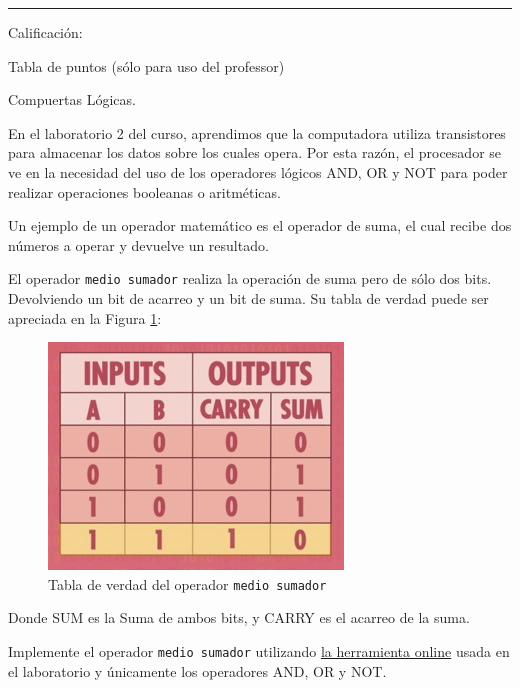 \documentclass[12pt]{exam}
\begin{document}
\newpage
\noindent
\rule[2ex]{\textwidth}{2pt}
\Large{Calificación}:
\normalsize
\begin{center}
Tabla de puntos (sólo para uso del professor)\\
\addpoints
\gradetable[v][questions]
\end{center}
\noindent
\newpage

\begin{questions}

\question[5] Compuertas Lógicas.

En el laboratorio 2 del curso, aprendimos que la computadora utiliza transistores para almacenar los datos sobre los cuales opera. Por esta razón, el procesador se ve en la necesidad del uso de los operadores lógicos AND, OR y NOT para poder realizar operaciones booleanas o aritméticas.

Un ejemplo de un operador matemático es el operador de suma, el cual recibe dos números a operar y devuelve un resultado.

El operador \lstinline{medio sumador} realiza la operación de suma pero de sólo dos bits. Devolviendo un bit de acarreo y un bit de suma. Su tabla de verdad puede ser apreciada en la Figura \ref{fig:suma}:

\begin{figure}[ht!]
  \centering
  \includegraphics[width=0.4\linewidth]{../figures/suma.jpg}
  \caption{Tabla de verdad del operador \lstinline{medio sumador}}
  \label{fig:suma}
\end{figure}

Donde SUM es la Suma de ambos bits, y CARRY es el acarreo de la suma.

Implemente el operador \lstinline{medio sumador} utilizando \href{https://academo.org/demos/logic-gate-simulator/}{la herramienta online} usada en el laboratorio y únicamente los operadores AND, OR y NOT.


\end{questions}
\end{document}
